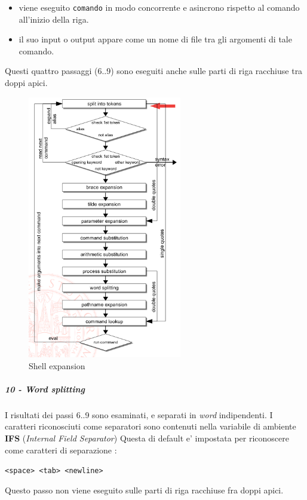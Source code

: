 \begin{itemize}
	\item viene eseguito \texttt{comando} in modo concorrente e asincrono rispetto al comando
		all'inizio della riga.
	\item il suo input o output appare come un nome di file tra gli argomenti di tale comando.
\end{itemize}
Questi quattro passaggi (6..9) sono eseguiti anche sulle parti 
di riga racchiuse tra doppi apici.

\begin{figure}
	\begin{center}
		\includegraphics[width=0.6\textwidth]{img/shell-expansion.png}
		\caption{Shell expansion}
	\end{center}
\end{figure}
\subparagraph{10 - Word splitting}
I risultati dei passi 6..9 sono esaminati, e separati in \emph{word} indipendenti. I caratteri riconosciuti
come separatori sono contenuti nella variabile di ambiente \textbf{IFS} (\emph{Internal Field Separator})
Questa di default e' impostata per riconoscere come caratteri di separazione :
\begin{center}
	\texttt{<space> <tab> <newline>}
\end{center}
Questo passo non viene eseguito sulle parti di riga racchiuse fra doppi apici.


